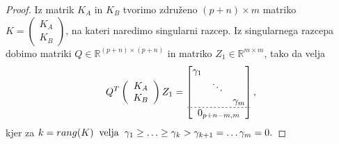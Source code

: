 \documentclass[mat1]{article}
\begin{document}
\begin{proof}

Iz matrik $K_A$ in $K_B$ tvorimo združeno $(p+n)\times m$ matriko $K = \left(\begin{array}{c} K_A \\ K_B \end{array}\right)$, na kateri naredimo singularni razcep. Iz singularnega razcepa dobimo matriki $Q \in \mathbb{R}^{(p+n) \times (p+n)}$ in matriko $Z_1 \in \mathbb{R}^{m \times m}$, tako da velja 
\begin{equation}
Q^T \left(\begin{array}{c} K_A \\ K_B \end{array}\right) Z_1 = 
\begin{bmatrix}
\begin{matrix}
\gamma_1 & & \\
 & \ddots & \\
 & & \gamma_m
\end{matrix} \\ \hdashline[2pt/2pt]
0_{p+n-m, m}
\end{bmatrix} 
\text{,}
\label{eq:1}
\end{equation}
kjer za
$
k = rang(K) \hspace{2mm} \text{velja} \hspace{2mm} 
\gamma_1 \geq \ldots \geq \gamma_k > \gamma_{k+1} = \ldots \gamma_m = 0\text{.} $


\end{proof}
\end{document}
